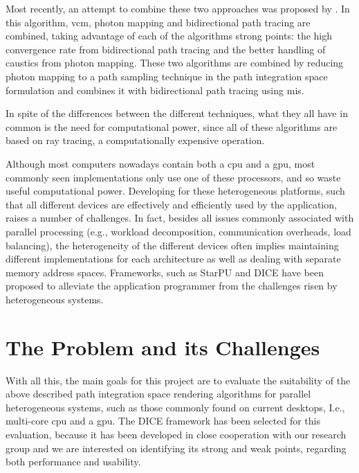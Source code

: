 Most recently, an attempt to combine these two approaches was proposed by \cite{Georgiev}. In this algorithm, \gls{vcm}, photon mapping and bidirectional path tracing are combined, taking advantage of each of the algorithms strong points: the high convergence rate from bidirectional path tracing and the better handling of caustics from photon mapping. These two algorithms are combined by reducing photon mapping to a path sampling technique in the path integration space formulation and combines it with bidirectional path tracing using \gls{mis}.

In spite of the differences between the different techniques, what they all have in common is the need for computational power, since all of these algorithms are based on ray tracing, a computationally expensive operation.

Although most computers nowadays contain both a \gls{cpu} and a \gls{gpu}, most commonly seen implementations only use one of these processors, and so waste useful computational power. Developing for these heterogeneous platforms, such that all different devices are effectively and efficiently used by the application, raises a number of challenges. In fact, besides all issues commonly associated with parallel processing (e.g., workload decomposition, communication overheads, load balancing), the heterogeneity of the different devices often implies maintaining different implementations for each architecture as well as dealing with separate memory address spaces.
Frameworks, such as StarPU \citep{augonnet2011starpu} and DICE \citep{Barbosa} have been proposed to alleviate the application programmer from the challenges risen by heterogeneous systems. 

\section{The Problem and its Challenges}


With all this, the main goals for this project are to evaluate the suitability of the above described path integration space rendering algorithms for parallel heterogeneous systems, such as those commonly found on current desktops, I.e., multi-core \gls{cpu} and a \gls{gpu}. The DICE framework has been selected for this evaluation, because it has been developed in close cooperation with our research group and we are interested on identifying its strong and weak points, regarding both performance and usability.

